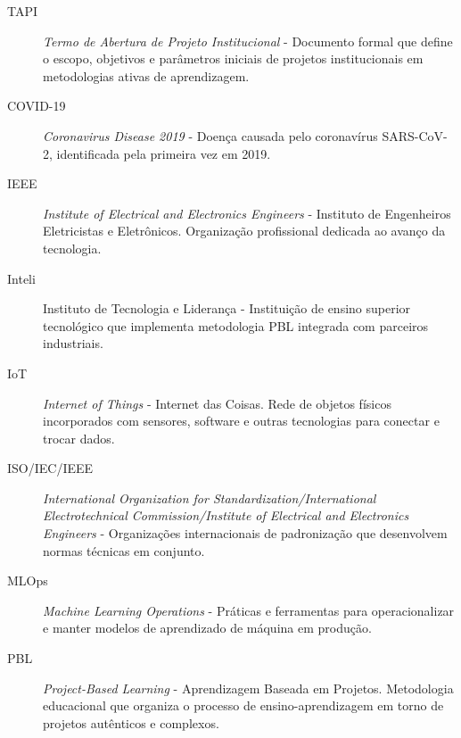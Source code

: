 \documentclass[12pt,a4paper]{article}
\begin{document}
\begin{description}
\item[TAPI] \textit{Termo de Abertura de Projeto Institucional} - Documento formal que define o escopo, objetivos e parâmetros iniciais de projetos institucionais em metodologias ativas de aprendizagem.

\item[COVID-19] \textit{Coronavirus Disease 2019} - Doença causada pelo coronavírus SARS-CoV-2, identificada pela primeira vez em 2019.

\item[IEEE] \textit{Institute of Electrical and Electronics Engineers} - Instituto de Engenheiros Eletricistas e Eletrônicos. Organização profissional dedicada ao avanço da tecnologia.

\item[Inteli] Instituto de Tecnologia e Liderança - Instituição de ensino superior tecnológico que implementa metodologia PBL integrada com parceiros industriais.

\item[IoT] \textit{Internet of Things} - Internet das Coisas. Rede de objetos físicos incorporados com sensores, software e outras tecnologias para conectar e trocar dados.

\item[ISO/IEC/IEEE] \textit{International Organization for Standardization/International Electrotechnical Commission/Institute of Electrical and Electronics Engineers} - Organizações internacionais de padronização que desenvolvem normas técnicas em conjunto.

\item[MLOps] \textit{Machine Learning Operations} - Práticas e ferramentas para operacionalizar e manter modelos de aprendizado de máquina em produção.

\item[PBL] \textit{Project-Based Learning} - Aprendizagem Baseada em Projetos. Metodologia educacional que organiza o processo de ensino-aprendizagem em torno de projetos autênticos e complexos.

\end{description}

\newpage
\thispagestyle{empty}
\tableofcontents

\newpage
\pagestyle{plain}
\renewcommand{\baselinestretch}{1.5}
\normalsize

\end{document}
